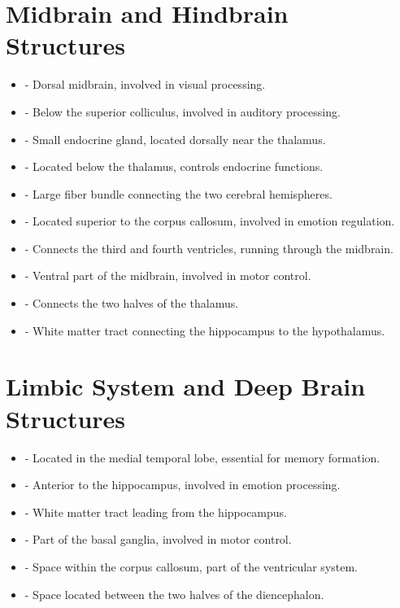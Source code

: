 \section*{Midbrain and Hindbrain Structures}
\begin{itemize}
    \item {} - Dorsal midbrain, involved in visual processing.
    \item {} - Below the superior colliculus, involved in auditory processing.
    \item {} - Small endocrine gland, located dorsally near the thalamus.
    \item {} - Located below the thalamus, controls endocrine functions.
    \item {} - Large fiber bundle connecting the two cerebral hemispheres.
    \item {} - Located superior to the corpus callosum, involved in emotion regulation.
    \item {} - Connects the third and fourth ventricles, running through the midbrain.
    \item {} - Ventral part of the midbrain, involved in motor control.
    \item {} - Connects the two halves of the thalamus.
    \item {} - White matter tract connecting the hippocampus to the hypothalamus.
\end{itemize}

\section*{Limbic System and Deep Brain Structures}
\begin{itemize}
    \item {} - Located in the medial temporal lobe, essential for memory formation.
    \item {} - Anterior to the hippocampus, involved in emotion processing.
    \item {} - White matter tract leading from the hippocampus.
    \item {} - Part of the basal ganglia, involved in motor control.
    \item {} - Space within the corpus callosum, part of the ventricular system.
    \item {} - Space located between the two halves of the diencephalon.
\end{itemize}

